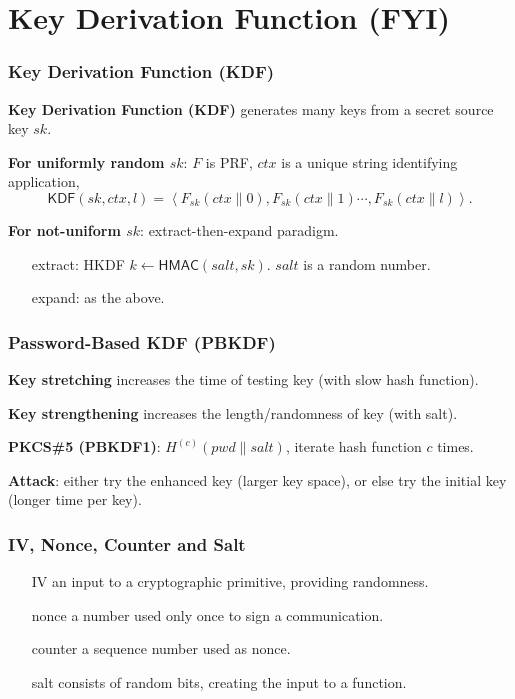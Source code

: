 \section{Key Derivation Function (FYI)}
\begin{frame}\frametitle{Key Derivation Function (KDF)}
\textbf{Key Derivation Function (KDF)} generates many keys from a secret source key $sk$.
\newline

\textbf{For uniformly random $sk$}: $F$ is PRF, $ctx$ is a unique string identifying application,
\[\mathsf{KDF}(sk,ctx,l) = \left<F_{sk}(ctx\|0),F_{sk}(ctx\|1)\cdots,F_{sk}(ctx\|l)\right>.\]

\textbf{For not-uniform $sk$}: extract-then-expand paradigm.\\
\begin{itemize}
\item[extract:] HKDF $k \gets \mathsf{HMAC}(salt,sk)$. $salt$ is a random number.
\item[expand:] as the above.
\end{itemize}
\end{frame}
\begin{frame}\frametitle{ Password-Based KDF (PBKDF)}
\textbf{Key stretching} increases the time of testing key (with slow hash function).
\newline

\textbf{Key strengthening} increases the length/randomness of key (with salt).
\newline

\textbf{PKCS\#5 (PBKDF1)}: $H^{(c)}(pwd\|salt)$, iterate hash function $c$ times.
\newline

\textbf{Attack}: either try the enhanced key (larger key space), or else try the initial key (longer time per key).
\end{frame}
\begin{frame}\frametitle{IV, Nonce, Counter and Salt}
\begin{itemize}
\item[IV] an input to a cryptographic primitive, providing randomness. 
\item[nonce] a number used only once to sign a communication.
\item[counter] a sequence number used as nonce.
\item[salt] consists of random bits, creating the input to a function. 
\end{itemize}
\end{frame}
